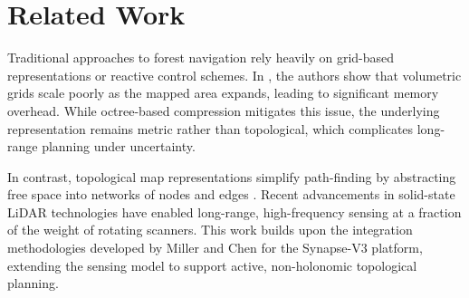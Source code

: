 \section{Related Work}
Traditional approaches to forest navigation rely heavily on grid-based representations or reactive control schemes. In \cite{nimbus2021octomap}, the authors show that volumetric grids scale poorly as the mapped area expands, leading to significant memory overhead. While octree-based compression mitigates this issue, the underlying representation remains metric rather than topological, which complicates long-range planning under uncertainty.

In contrast, topological map representations simplify path-finding by abstracting free space into networks of nodes and edges \cite{takahashi2022topological}. Recent advancements in solid-state LiDAR technologies \cite{meridian2022lidar} have enabled long-range, high-frequency sensing at a fraction of the weight of rotating scanners. This work builds upon the integration methodologies developed by Miller and Chen \cite{miller2023nexa} for the Synapse-V3 platform, extending the sensing model to support active, non-holonomic topological planning.
